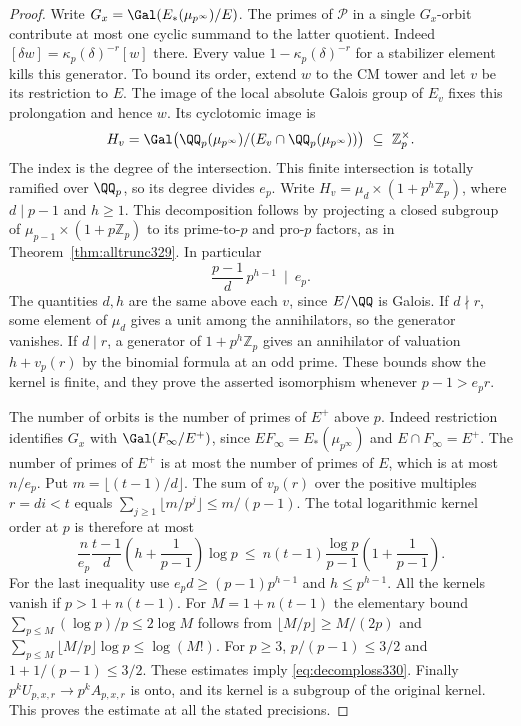 \documentclass[a4paper,11pt]{article}
\theoremstyle{definition}
\theoremstyle{remark}
\newcommand{\ZZ}{\mathbb Z}\newcommand{\ord}{\operatorname{ord}}
\numberwithin{equation}{section}
\begin{document}
\begin{proof}
Write \(G_x=\Gal(E_*(\mu_{p^\infty})/E)\). The primes of
\(\mathcal P\) in a single \(G_x\)-orbit contribute at most
one cyclic summand to the latter quotient. Indeed
\([\delta w]=\kappa_p(\delta)^{-r}[w]\) there. Every value
\(1-\kappa_p(\delta)^{-r}\) for a stabilizer element kills
this generator. To bound its order, extend \(w\) to the CM
tower and let \(v\) be its restriction to \(E\). The image
of the local absolute Galois group of \(E_v\) fixes this
prolongation and hence \(w\). Its cyclotomic image is
\[
 H_v=\Gal\bigl(\QQ_p(\mu_{p^\infty})/
                 (E_v\cap\QQ_p(\mu_{p^\infty}))\bigr)
       \ \subseteq\ \ZZ_p^\times .
\]
The index is the degree of the intersection. This finite
intersection is totally ramified over \(\QQ_p\), so its degree
divides \(e_p\). Write \(H_v=\mu_d\times(1+p^h\ZZ_p)\), where
\(d\mid p-1\) and \(h\ge1\). This decomposition follows by
projecting a closed subgroup of
\(\mu_{p-1}\times(1+p\ZZ_p)\) to its prime-to-\(p\) and
pro-\(p\) factors, as in Theorem~\ref{thm:alltrunc329}.
In particular
\[
        \frac{p-1}{d}\,p^{h-1}\ \mid\ e_p .
\]
The quantities \(d,h\) are the same above each \(v\), since
\(E/\QQ\) is Galois. If \(d\nmid r\), some element of \(\mu_d\)
gives a unit among the annihilators, so the generator vanishes.
If \(d\mid r\), a generator of \(1+p^h\ZZ_p\) gives an
annihilator of valuation \(h+v_p(r)\) by the binomial formula
at an odd prime. These bounds show the kernel is finite,
and they prove the asserted isomorphism whenever \(p-1>e_pr\).

The number of orbits is the number of primes of \(E^+\) above
\(p\). Indeed restriction identifies \(G_x\) with
\(\Gal(F_\infty/E^+)\), since \(EF_\infty=E_*(\mu_{p^\infty})\)
and \(E\cap F_\infty=E^+\). The number of primes of \(E^+\)
is at most the number of primes of \(E\), which is at most
\(n/e_p\). Put \(m=\lfloor(t-1)/d\rfloor\). The sum of \(v_p(r)\)
over the positive multiples \(r=di<t\) equals
\(\sum_{j\ge1}\lfloor m/p^j\rfloor\le m/(p-1)\).
The total logarithmic kernel order at \(p\) is therefore at most
\[
 \frac{n}{e_p}\frac{t-1}{d}
          \left(h+\frac1{p-1}\right)\log p
 \ \le\ n(t-1)\frac{\log p}{p-1}
          \left(1+\frac1{p-1}\right).
\]
For the last inequality use \(e_pd\ge (p-1)p^{h-1}\) and
\(h\le p^{h-1}\). All the kernels vanish if \(p>1+n(t-1)\).
For \(M=1+n(t-1)\) the elementary bound
\(\sum_{p\le M}(\log p)/p\le2\log M\) follows from
\(\lfloor M/p\rfloor\ge M/(2p)\) and
\(\sum_{p\le M}\lfloor M/p\rfloor\log p\le \log(M!)\).
For \(p\ge3\), \(p/(p-1)\le3/2\) and \(1+1/(p-1)\le3/2\).
These estimates imply \eqref{eq:decomploss330}. Finally
\(p^k U_{p,x,r}\to p^k A_{p,x,r}\) is onto, and its kernel
is a subgroup of the original kernel. This proves the estimate
at all the stated precisions.
\end{proof}
\end{document}
